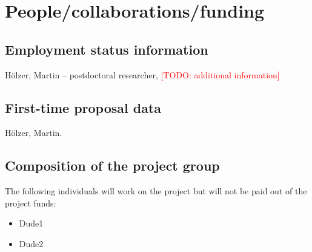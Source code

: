 \documentclass[american,firsttime]{dfgproposal}
\newcommand{\todo}[1]{\xspace{\textcolor{red}{[TODO: #1]}}\xspace}
\begin{document}
	\section{People/collaborations/funding}
	
	\subsection{Employment status information}
	H\"olzer, Martin -- postdoctoral researcher, \todo{additional information}
	
	\subsection{First-time proposal data}
	H\"olzer, Martin.
	
	\subsection{Composition of the project group}
	The following individuals will work on the project but will not be paid out of
	the project funds:
	
	\begin{itemize}
		\item Dude1
		\item Dude2
	\end{itemize}
	
\end{document}
